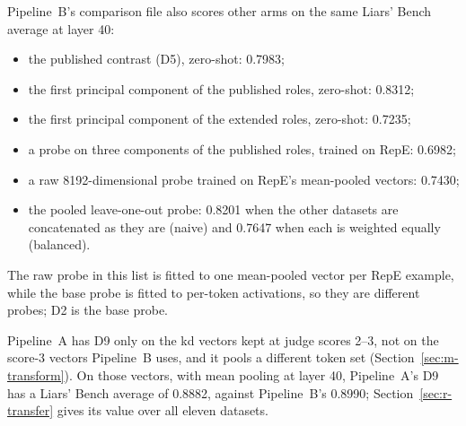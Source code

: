 Pipeline~B's comparison file also scores other arms on the same Liars' Bench average at layer 40:
\begin{itemize}
\item the published contrast (D5), zero-shot: 0.7983; %
\item the first principal component of the published roles, zero-shot: 0.8312; %
\item the first principal component of the extended roles, zero-shot: 0.7235; %
\item a probe on three components of the published roles, trained on RepE: 0.6982; %
\item a raw 8192-dimensional probe trained on RepE's mean-pooled vectors: 0.7430; %
\item the pooled leave-one-out probe: 0.8201 when the other datasets are concatenated as they are (naive) and 0.7647 when each is weighted equally (balanced). %
\end{itemize}
The raw probe in this list is fitted to one mean-pooled vector per RepE example, while the base probe is fitted to per-token activations, so they are different probes; D2 is the base probe. %

Pipeline~A has D9 only on the kd vectors kept at judge scores 2--3, not on the score-3 vectors Pipeline~B uses, and it pools a different token set (Section~\ref{sec:m-transform}). %
On those vectors, with mean pooling at layer 40, Pipeline~A's D9 has a Liars' Bench average of 0.8882, against Pipeline~B's 0.8990; Section~\ref{sec:r-transfer} gives its value over all eleven datasets. %

